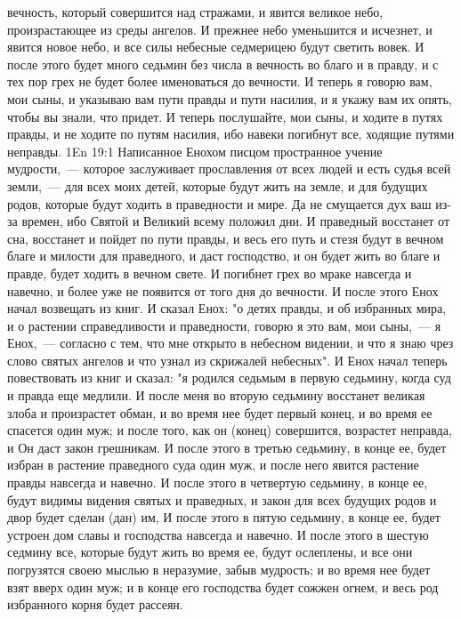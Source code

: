 вечность, который совершится над стражами, и явится великое небо,
произрастающее из среды ангелов.
И прежнее небо уменьшится и исчезнет, и явится новое небо, и все силы
небесные седмерицею будут светить вовек.
И после этого будет много седьмин без числа в вечность во благо и в
правду, и с тех пор грех не будет более именоваться до вечности.
И теперь я говорю вам, мои сыны, и указываю вам пути правды и пути
насилия, и я укажу вам их опять, чтобы вы знали, что придет.
И теперь послушайте, мои сыны, и ходите в путях правды, и не ходите по
путям насилия, ибо навеки погибнут все, ходящие путями неправды.
\vs 1En 19:1
Написанное Енохом писцом пространное учение мудрости,~---
которое заслуживает прославления от всех людей и есть судья всей земли,~---
для всех моих детей, которые будут жить на земле, и для будущих родов,
которые будут ходить в праведности и мире.
Да не смущается дух ваш из-за времен, ибо Святой и Великий всему
положил дни.
И праведный восстанет от сна, восстанет и пойдет по пути правды, и весь
его путь и стезя будут в вечном благе и милости для праведного, и даст
господство, и он будет жить во благе и правде, будет ходить в вечном свете.
И погибнет грех во мраке навсегда и навечно, и более уже не появится от
того дня до вечности.
И после этого Енох начал возвещать из книг.
И сказал Енох: "о детях правды, и об избранных мира, и о растении
справедливости и праведности, говорю я это вам, мои сыны,~--- я Енох,~--- согласно с
тем, что мне открыто в небесном видении, и что я знаю чрез слово святых ангелов
и что узнал из скрижалей небесных".
И Енох начал теперь повествовать из книг и сказал: "я родился седьмым
в первую седьмину, когда суд и правда еще медлили.
И после меня во вторую седьмину восстанет великая злоба и произрастет
обман, и во время нее будет первый конец, и во время ее спасется один муж; и
после того, как он (конец) совершится, возрастет неправда, и Он даст закон
грешникам.
И после этого в третью седьмину, в конце ее, будет избран в растение
праведного суда один муж, и после него явится растение правды навсегда и
навечно.
И после этого в четвертую седьмину, в конце ее, будут видимы видения
святых и праведных, и закон для всех будущих родов и двор будет сделан (дан)
им, И после этого в пятую седьмину, в конце ее, будет устроен дом славы и
господства навсегда и навечно.
И после этого в шестую седмину все, которые будут жить во время ее,
будут ослеплены, и все они погрузятся своею мыслью в неразумие, забыв мудрость;
и во время нее будет взят вверх один муж; и в конце его господства будет сожжен
огнем, и весь род избранного корня будет рассеян.
